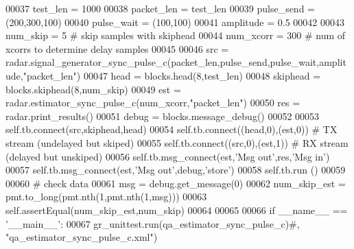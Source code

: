 \begin{DoxyCode}
00037         test\_len = 1000
00038         packet\_len = test\_len
00039         pulse\_send = (200,300,100)
00040         pulse\_wait = (100,100)
00041         amplitude = 0.5
00042         
00043         num\_skip = 5 \textcolor{comment}{# skip samples with skiphead}
00044         num\_xcorr = 300 \textcolor{comment}{# num of xcorrs to determine delay samples}
00045         
00046         src = radar.signal\_generator\_sync\_pulse\_c(packet\_len,pulse\_send,pulse\_wait,amplitude,\textcolor{stringliteral}{"packet\_len"})
00047         head = blocks.head(8,test\_len)
00048         skiphead = blocks.skiphead(8,num\_skip)
00049         est = radar.estimator\_sync\_pulse\_c(num\_xcorr,\textcolor{stringliteral}{"packet\_len"})
00050         res = radar.print\_results()
00051         debug = blocks.message\_debug()
00052         
00053         self.tb.connect(src,skiphead,head)
00054         self.tb.connect((head,0),(est,0)) \textcolor{comment}{# TX stream (undelayed but skiped)}
00055         self.tb.connect((src,0),(est,1)) \textcolor{comment}{# RX stream (delayed but unskiped)}
00056         self.tb.msg\_connect(est,\textcolor{stringliteral}{'Msg out'},res,\textcolor{stringliteral}{'Msg in'})
00057         self.tb.msg\_connect(est,\textcolor{stringliteral}{'Msg out'},debug,\textcolor{stringliteral}{'store'})
00058         self.tb.run ()
00059         
00060         \textcolor{comment}{# check data}
00061         msg = debug.get\_message(0)
00062         num\_skip\_est = pmt.to\_long(pmt.nth(1,pmt.nth(1,msg)))
00063         self.assertEqual(num\_skip\_est,num\_skip)
00064 
00065 
00066 \textcolor{keywordflow}{if} \_\_name\_\_ == \textcolor{stringliteral}{'\_\_main\_\_'}:
00067     gr\_unittest.run(qa\_estimator\_sync\_pulse\_c)\textcolor{comment}{#, "qa\_estimator\_sync\_pulse\_c.xml")}
\end{DoxyCode}
